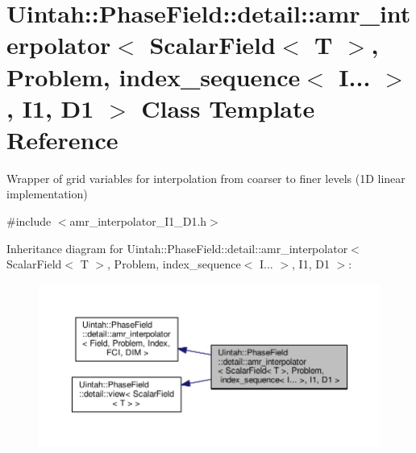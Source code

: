 \hypertarget{classUintah_1_1PhaseField_1_1detail_1_1amr__interpolator_3_01ScalarField_3_01T_01_4_00_01Problem71844444bc14a03c0566689b6b502040}{}\section{Uintah\+:\+:Phase\+Field\+:\+:detail\+:\+:amr\+\_\+interpolator$<$ Scalar\+Field$<$ T $>$, Problem, index\+\_\+sequence$<$ I... $>$, I1, D1 $>$ Class Template Reference}
\label{classUintah_1_1PhaseField_1_1detail_1_1amr__interpolator_3_01ScalarField_3_01T_01_4_00_01Problem71844444bc14a03c0566689b6b502040}


Wrapper of grid variables for interpolation from coarser to finer levels (1D linear implementation)  




{\ttfamily \#include $<$amr\+\_\+interpolator\+\_\+\+I1\+\_\+\+D1.\+h$>$}



Inheritance diagram for Uintah\+:\+:Phase\+Field\+:\+:detail\+:\+:amr\+\_\+interpolator$<$ Scalar\+Field$<$ T $>$, Problem, index\+\_\+sequence$<$ I... $>$, I1, D1 $>$\+:\nopagebreak
\begin{figure}[H]
\begin{center}
\leavevmode
\includegraphics[width=350pt]{classUintah_1_1PhaseField_1_1detail_1_1amr__interpolator_3_01ScalarField_3_01T_01_4_00_01Problem7a982fef67338c89568bbf31cbc3f89e}
\end{center}
\end{figure}


